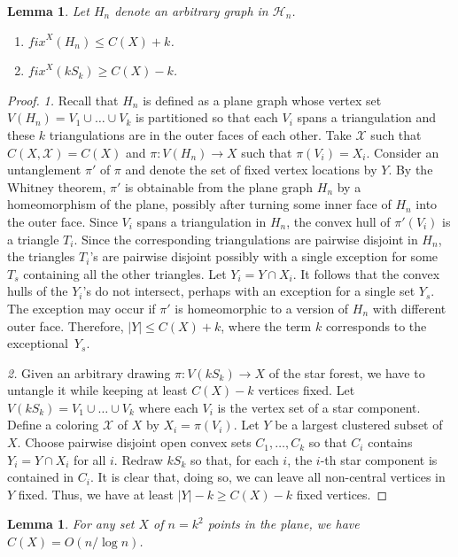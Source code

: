 \documentclass[reqno,12pt]{amsart}
\newtheorem{lemma}[theorem]{Lemma}
\newenvironment{bfenumerate}{\renewcommand{\labelenumi}{{\bf\theenumi.}}\renewcommand{\labelenumii}{{\bf(\theenumii)}}\begin{enumerate}}{\end{enumerate}}
\newcommand{\function}[2]{:#1 \rightarrow #2}
\newcommand{\fixx}[1]{\mathit{fix}^X(#1)}
\newcommand{\colX}{{\mathcal X}}
\newcommand{\calH}{{\mathcal H}}
\begin{document}
\begin{lemma}\label{lem:fixxC}
Let $H_n$ denote an arbitrary graph in $\calH_n$.
\begin{bfenumerate}
\item
$\fixx{H_n}\le C(X)+k$.
\item
$\fixx{kS_k}\ge C(X)-k$.
\end{bfenumerate}
\end{lemma}

\begin{proof}
{\sl 1.}
Recall that $H_n$ is defined as a plane graph whose vertex set
$V(H_n)=V_1\cup\ldots\cup V_k$ is partitioned so that each $V_i$ spans
a triangulation and these $k$ triangulations are in the outer faces of each other.
Take $\colX$ such that $C(X,\colX)=C(X)$ and
$\pi\function{V(H_n)}{X}$ such that $\pi(V_i)=X_i$.
Consider an untanglement $\pi'$ of $\pi$ and denote the set
of fixed vertex locations by $Y$. 
By the Whitney theorem, $\pi'$ is obtainable from the plane graph $H_n$
by a homeomorphism of the plane, possibly after turning some inner face of $H_n$
into the outer face.
Since $V_i$ spans a triangulation in $H_n$, the convex hull of $\pi'(V_i)$
is a triangle $T_i$. Since the corresponding triangulations are pairwise
disjoint in $H_n$, the triangles $T_i$'s are pairwise disjoint possibly with
a single exception for some $T_s$ containing all the other triangles.
Let $Y_i=Y\cap X_i$. It follows that the convex hulls of the
$Y_i$'s do not intersect, perhaps with an exception for a single
set $Y_s$. The exception may occur if $\pi'$ is homeomorphic to a version 
of $H_n$ with different outer face.
Therefore, $|Y|\le C(X)+k$, where the term $k$ corresponds to the exceptional~$Y_s$.

{\sl 2.}
Given an arbitrary drawing $\pi\function{V(kS_k)}{X}$ of the star forest, 
we have to untangle it while keeping at least $C(X)-k$ vertices
fixed. Let $V(kS_k)=V_1\cup\ldots\cup V_k$ where each $V_i$ is the vertex set
of a star component. Define a coloring $\colX$ of $X$ by $X_i=\pi(V_i)$.
Let $Y$ be a largest clustered subset of $X$. 
Choose pairwise disjoint open convex sets $C_1,\ldots,C_k$ so that $C_i$ 
contains $Y_i=Y\cap X_i$ for all $i$. Redraw $kS_k$ so that, for each $i$, 
the $i$-th star component is contained in $C_i$. It is
clear that, doing so, we can leave all non-central vertices in $Y$ fixed.
Thus, we have at least $|Y|-k\ge C(X)-k$ fixed vertices.
\end{proof}

\begin{lemma}\label{lem:CX}
For any set $X$ of $n=k^2$ points in the plane, we have $C(X)=O(n/\log n)$.
\end{lemma}
\end{document}

